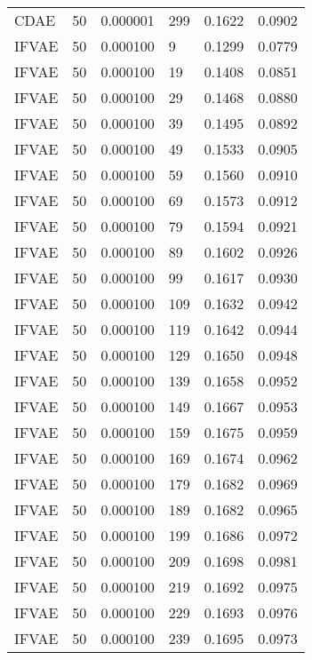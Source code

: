 \begin{tabular}{llrlrr}
    CDAE &   50 &  0.000001 &   299 &  0.1622 &       0.0902 \\
   IFVAE &   50 &  0.000100 &     9 &  0.1299 &       0.0779 \\
   IFVAE &   50 &  0.000100 &    19 &  0.1408 &       0.0851 \\
   IFVAE &   50 &  0.000100 &    29 &  0.1468 &       0.0880 \\
   IFVAE &   50 &  0.000100 &    39 &  0.1495 &       0.0892 \\
   IFVAE &   50 &  0.000100 &    49 &  0.1533 &       0.0905 \\
   IFVAE &   50 &  0.000100 &    59 &  0.1560 &       0.0910 \\
   IFVAE &   50 &  0.000100 &    69 &  0.1573 &       0.0912 \\
   IFVAE &   50 &  0.000100 &    79 &  0.1594 &       0.0921 \\
   IFVAE &   50 &  0.000100 &    89 &  0.1602 &       0.0926 \\
   IFVAE &   50 &  0.000100 &    99 &  0.1617 &       0.0930 \\
   IFVAE &   50 &  0.000100 &   109 &  0.1632 &       0.0942 \\
   IFVAE &   50 &  0.000100 &   119 &  0.1642 &       0.0944 \\
   IFVAE &   50 &  0.000100 &   129 &  0.1650 &       0.0948 \\
   IFVAE &   50 &  0.000100 &   139 &  0.1658 &       0.0952 \\
   IFVAE &   50 &  0.000100 &   149 &  0.1667 &       0.0953 \\
   IFVAE &   50 &  0.000100 &   159 &  0.1675 &       0.0959 \\
   IFVAE &   50 &  0.000100 &   169 &  0.1674 &       0.0962 \\
   IFVAE &   50 &  0.000100 &   179 &  0.1682 &       0.0969 \\
   IFVAE &   50 &  0.000100 &   189 &  0.1682 &       0.0965 \\
   IFVAE &   50 &  0.000100 &   199 &  0.1686 &       0.0972 \\
   IFVAE &   50 &  0.000100 &   209 &  0.1698 &       0.0981 \\
   IFVAE &   50 &  0.000100 &   219 &  0.1692 &       0.0975 \\
   IFVAE &   50 &  0.000100 &   229 &  0.1693 &       0.0976 \\
   IFVAE &   50 &  0.000100 &   239 &  0.1695 &       0.0973 \\

\end{tabular}
